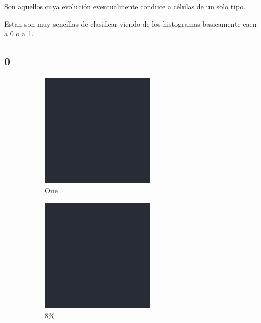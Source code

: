\documentclass[12pt, fleqn]{report}                             %
\theoremstyle{break}                                            %
\begin{document}
      Son aquellos cuya evolución eventualmente conduce a células de un solo tipo.

      Estan son muy sencillas de clasificar viendo de los histogramas basicamente caen a 0 o a 1.
            
      \subsection{0}
      \begin{figure}[ht!]
        \centering
        \begin{subfigure}[b]{0.4\linewidth}
          \includegraphics[width=0.6\textwidth]{Images/0/a.png}
          \caption{One}
        \end{subfigure}
        \begin{subfigure}[b]{0.4\linewidth}
          \includegraphics[width=0.6\textwidth]{Images/0/b.png}
          \caption{8\%}
        \end{subfigure}
        \begin{subfigure}[b]{0.4\linewidth}

\end{subfigure}
\end{figure}
\end{document}
